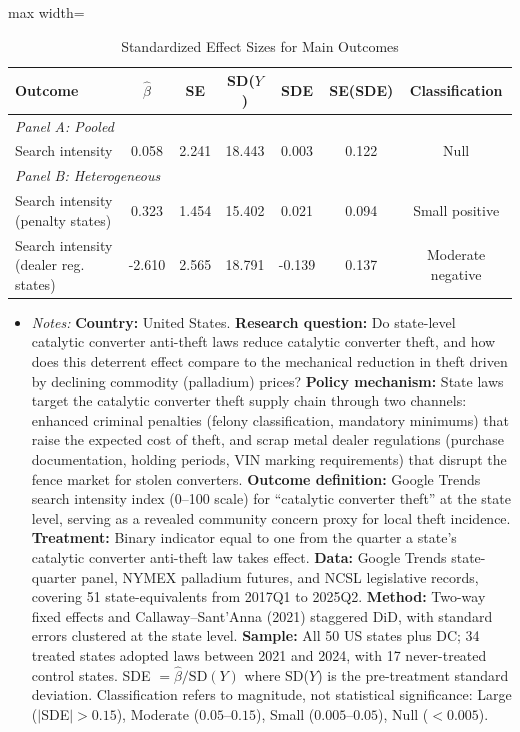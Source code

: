 \begin{table}[H]
\centering
\caption{Standardized Effect Sizes for Main Outcomes}
\label{tab:sde}
\begin{adjustbox}{max width=\textwidth}
\begin{tabular}{lcccccc}
\toprule
Outcome & $\hat{\beta}$ & SE & SD($Y$) & SDE & SE(SDE) & Classification \\
\midrule
\multicolumn{7}{l}{\textit{Panel A: Pooled}} \\
Search intensity & 0.058 & 2.241 & 18.443 & 0.003 & 0.122 & Null \\
\midrule
\multicolumn{7}{l}{\textit{Panel B: Heterogeneous}} \\
Search intensity (penalty states) & 0.323 & 1.454 & 15.402 & 0.021 & 0.094 & Small positive \\
Search intensity (dealer reg. states) & -2.610 & 2.565 & 18.791 & -0.139 & 0.137 & Moderate negative \\
\bottomrule
\end{tabular}
\end{adjustbox}
\par\vspace{0.3em}
{\footnotesize
\begin{itemize}[leftmargin=*]
\item \textit{Notes:} \textbf{Country:} United States. \textbf{Research question:} Do state-level catalytic converter anti-theft laws reduce catalytic converter theft, and how does this deterrent effect compare to the mechanical reduction in theft driven by declining commodity (palladium) prices? \textbf{Policy mechanism:} State laws target the catalytic converter theft supply chain through two channels: enhanced criminal penalties (felony classification, mandatory minimums) that raise the expected cost of theft, and scrap metal dealer regulations (purchase documentation, holding periods, VIN marking requirements) that disrupt the fence market for stolen converters. \textbf{Outcome definition:} Google Trends search intensity index (0--100 scale) for ``catalytic converter theft'' at the state level, serving as a revealed community concern proxy for local theft incidence. \textbf{Treatment:} Binary indicator equal to one from the quarter a state's catalytic converter anti-theft law takes effect. \textbf{Data:} Google Trends state-quarter panel, NYMEX palladium futures, and NCSL legislative records, covering 51 state-equivalents from 2017Q1 to 2025Q2. \textbf{Method:} Two-way fixed effects and Callaway--Sant'Anna (2021) staggered DiD, with standard errors clustered at the state level. \textbf{Sample:} All 50 US states plus DC; 34 treated states adopted laws between 2021 and 2024, with 17 never-treated control states. SDE $= \hat{\beta} / \text{SD}(Y)$ where SD($Y$) is the pre-treatment standard deviation. Classification refers to magnitude, not statistical significance: Large ($|$SDE$| > 0.15$), Moderate ($0.05$--$0.15$), Small ($0.005$--$0.05$), Null ($< 0.005$).
\end{itemize}}
\end{table}
